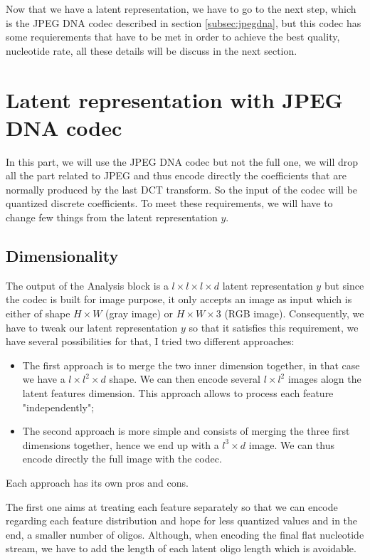 Now that we have a latent representation, we have to go to the next step, which is the JPEG DNA codec described in section \ref{subsec:jpegdna}, but this codec has some requierements that have to be met in order to achieve the best quality, nucleotide rate, all these details will be discuss in the next section.

\section{Latent representation with JPEG DNA codec}

In this part, we will use the JPEG DNA codec but not the full one, we will drop all the part related to JPEG and thus encode directly the coefficients that are normally produced by the last DCT transform. So the input of the codec will be quantized discrete coefficients. To meet these requirements, we will have to change few things from the latent representation $y$.

\subsection{Dimensionality}

The output of the Analysis block is a $l \times l \times l \times d$ latent representation $y$ but since the codec is built for image purpose, it only accepts an image as input which is either of shape $H \times W$ (gray image) or $H \times W \times 3$ (RGB image). 
Consequently, we have to tweak our latent representation $y$ so that it satisfies this requirement, we have several possibilities for that, I tried two different approaches:

\begin{itemize}
    \item The first approach is to merge the two inner dimension together, in that case we have a $l \times l^2 \times d$ shape. We can then encode several $l \times l^2$ images alogn the latent features dimension. This approach allows to process each feature "independently";
    \item The second approach is more simple and consists of merging the three first dimensions together, hence we end up with a $l^3 \times d$ image. We can thus encode directly the full image with the codec.
\end{itemize}

Each approach has its own pros and cons. 

The first one aims at treating each feature separately so that we can encode regarding each feature distribution and hope for less quantized values and in the end, a smaller number of oligos. Although, when encoding the final flat nucleotide stream, we have to add the length of each latent oligo length which is avoidable.


